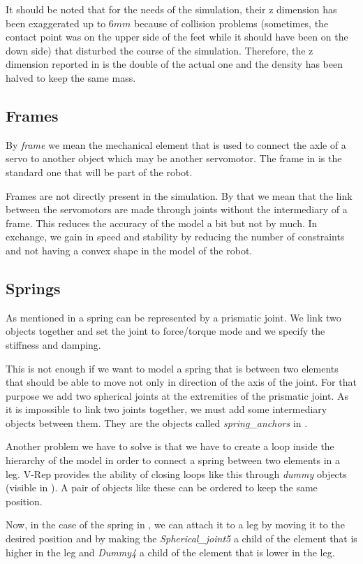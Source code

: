 It should be noted that for the needs of the simulation, their z dimension has been exaggerated up to $6mm$ because of collision problems (sometimes, the contact point was on the upper side of the feet while it should have been on the down side) that disturbed the course of the simulation. Therefore, the z dimension reported in  is the double of the actual one and the density has been halved to keep the same mass.

\subsection{Frames}
By \emph{frame} we mean the mechanical element that is used to connect the axle of a servo to another object which may be another servomotor. The frame in  is the standard one that will be part of the robot.

Frames are not directly present in the simulation. By that we mean that the link between the servomotors are made through joints without the intermediary of a frame. This reduces the accuracy of the model a bit but not by much. In exchange, we gain in speed and stability by reducing the number of constraints and not having a convex shape in the model of the robot.

\subsection{Springs}
As mentioned in  a spring can be represented by a prismatic joint. We link two objects together and set the joint to force/torque mode and we specify the stiffness and damping.

This is not enough if we want to model a spring that is between two elements that should be able to move not only in direction of the axis of the joint. For that purpose we add two spherical joints at the extremities of the prismatic joint. As it is impossible to link two joints together, we must add some intermediary objects between them. They are the objects called \emph{spring\_anchors} in .

Another problem we have to solve is that we have to create a loop inside the hierarchy of the model in order to connect a spring between two elements in a leg. V-Rep provides the ability of closing loops like this through \emph{dummy} objects (visible in ). A pair of objects like these can be ordered to keep the same position. 

Now, in the case of the spring in , we can attach it to a leg by moving it to the desired position and by making the \emph{Spherical\_joint5} a child of the element that is higher in the leg and \emph{Dummy4} a child of the element that is lower in the leg.

